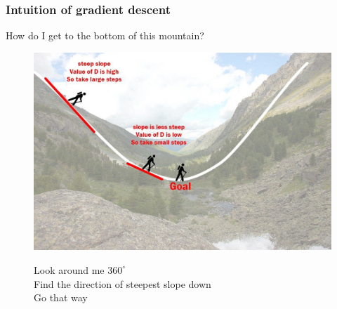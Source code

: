 \documentclass[13.5pt,aspecratio=169]{beamer}
\begin{document}
\begin{frame}
\onehalfspacing
	\frametitle{Intuition of gradient descent}
	
	\begin{block}{} %
		How do I get to the bottom of this mountain?
	\end{block}
        \bigskip
        \begin{figure}[h]
            \begin{minipage}{0.5\textwidth} %
                \centering
                \includegraphics[scale=0.15]{mountain.jpeg} %
            \end{minipage}
            \hfill
            \begin{minipage}{0.45\textwidth} %
                Look around me $360^\circ$ \\
                Find the direction of steepest slope down \\
                Go that way 
            \end{minipage}
        \end{figure}
\end{frame}
\end{document}
